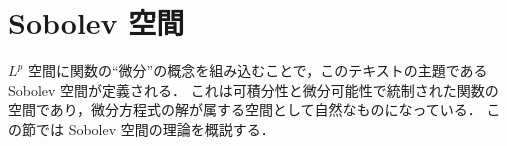 \section{Sobolev 空間}

$L^p$ 空間に関数の``微分''の概念を組み込むことで，このテキストの主題である Sobolev 空間が定義される．
これは可積分性と微分可能性で統制された関数の空間であり，微分方程式の解が属する空間として自然なものになっている．
この節では Sobolev 空間の理論を概説する．

% 
